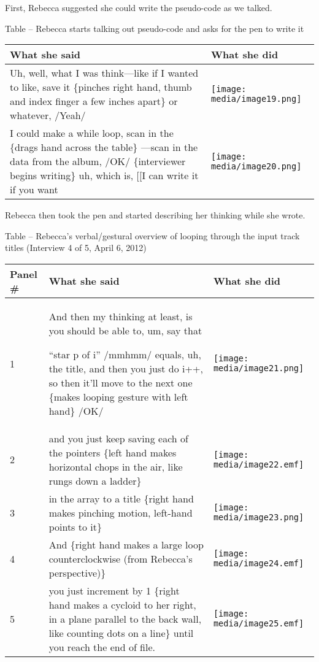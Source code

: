 First, Rebecca suggested she could write the pseudo-code as we talked.

\protect\hypertarget{ux5fToc252445963}{}{}Table -- Rebecca starts
talking out pseudo-code and asks for the pen to write it

\begin{longtable}[]{@{}ll@{}}
\toprule
What she said & What she did\tabularnewline
\midrule
\endhead
Uh, well, what I was think---like if I wanted to like,
\textbar{}\textbar{}save it\textbar{}\textbar{} \textbar{}\{pinches
right hand, thumb and index finger a few inches apart\}\textbar{} or
whatever, /Yeah/ &
\texttt{[image: media/image19.png]}\tabularnewline
I could make a while loop, \textbar{}\textbar{}scan in
the\textbar{}\textbar{} \textbar{}\{drags hand across the
table\}\textbar{} ---scan in the data from the album, /OK/ \{interviewer
begins writing\} uh, which is, {[}{[}I can write it if you want &
\texttt{[image: media/image20.png]}\tabularnewline
\bottomrule
\end{longtable}

Rebecca then took the pen and started describing her thinking while she
wrote.

\protect\hypertarget{ux5fToc252445964}{}{}Table -- Rebecca's
verbal/gestural overview of looping through the input track titles
(Interview 4 of 5, April 6, 2012)

\begin{longtable}[]{@{}lll@{}}
\toprule
Panel \# & What she said & What she did\tabularnewline
\midrule
\endhead
1 & And then my thinking at least, is you should be able to, um, say
that

``star p of i'' /mmhmm/ equals, uh, the title, and then you just do i++,
so then it'll \textbar{}\textbar{}move to the next
one\textbar{}\textbar{} \textbar{}\{makes looping gesture with left
hand\}\textbar{} /OK/ &
\texttt{[image: media/image21.png]}\tabularnewline
2 & and you just keep \textbar{}\textbar{}saving each of the
pointers\textbar{}\textbar{} \textbar{}\{left hand makes horizontal
chops in the air, like rungs down a ladder\}\textbar{} &
\texttt{[image: media/image22.emf]}\tabularnewline
3 & in the array \textbar{}\textbar{}to a title\textbar{}\textbar{}
\textbar{}\{right hand makes pinching motion, left-hand points to
it\}\textbar{} &
\texttt{[image: media/image23.png]}\tabularnewline
4 & \textbar{}\textbar{}And\textbar{}\textbar{} \textbar{}\{right hand
makes a large loop counterclockwise (from Rebecca's
perspective)\}\textbar{} &
\texttt{[image: media/image24.emf]}\tabularnewline
5 & \textbar{}\textbar{}you just increment by 1\textbar{}\textbar{}
\textbar{}\{right hand makes a cycloid to her right, in a plane parallel
to the back wall, like counting dots on a line\}\textbar{} until you
reach the end of file. &
\texttt{[image: media/image25.emf]}\tabularnewline
\bottomrule
\end{longtable}

